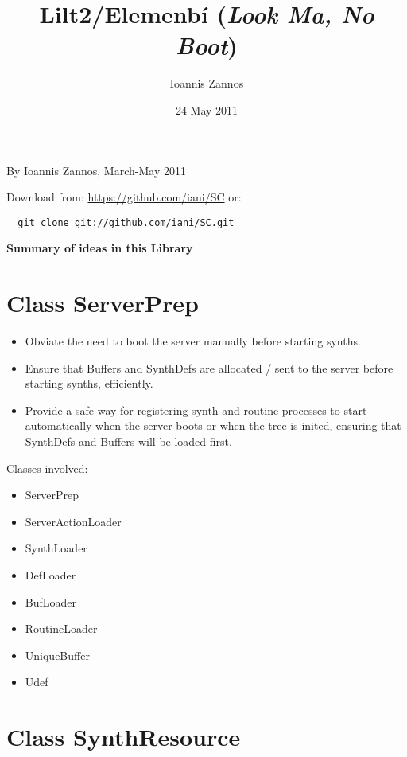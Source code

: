 \documentclass[11pt]{article}
\begin{document}
\title{Lilt2/Elemenb\'i (\emph{Look Ma, No Boot})}
\author{Ioannis Zannos}
\date{24 May 2011}
\maketitle

\setcounter{tocdepth}{3}
\tableofcontents
\vspace*{1cm}

By Ioannis Zannos, March-May 2011

Download from: \href{https://github.com/iani/SC}{https://github.com/iani/SC}
or:
\begin{verbatim}
  git clone git://github.com/iani/SC.git
\end{verbatim}


\textbf{Summary of ideas in this Library}

\section{Class ServerPrep}
\label{sec-1}


\begin{itemize}
\item Obviate the need to boot the server manually before starting synths.
\item Ensure that Buffers and SynthDefs are allocated / sent to the server
  before starting synths, efficiently.
\item Provide a safe way for registering synth and routine processes to start automatically when the server boots
  or when the tree is inited, ensuring that SynthDefs and Buffers will be loaded first.
\end{itemize}

Classes involved: 

\begin{itemize}
\item ServerPrep
\item ServerActionLoader
\item SynthLoader
\item DefLoader
\item BufLoader
\item RoutineLoader
\item UniqueBuffer
\item Udef
\end{itemize}
\section{Class SynthResource}
\label{sec-2}
\end{document}
